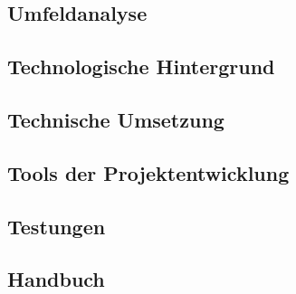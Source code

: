 \begin{spacing}{1}
	\chapter{Umfeldanalyse}
\end{spacing}


\begin{spacing}{1}
	\chapter{Technologische Hintergrund}
		\label{chapter:tech}
\end{spacing}


\begin{spacing}{1}
	\chapter{Technische Umsetzung}\label{chapter:implementation}
\end{spacing}


\begin{spacing}{1}
	\chapter{Tools der Projektentwicklung}\label{chapter:tools}
\end{spacing}


\begin{spacing}{1}
	\chapter{Testungen}\label{chapter:tests}
\end{spacing}


\begin{spacing}{1}
	\chapter{Handbuch}\label{chapter:handbuch}
\end{spacing}


